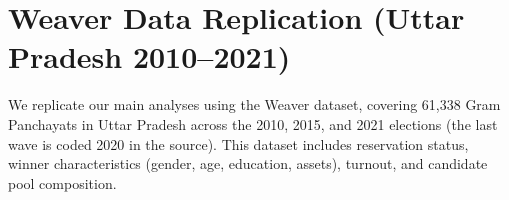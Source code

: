 \documentclass[12pt]{article}
\begin{document}

\FloatBarrier


\clearpage
\section{Weaver Data Replication (Uttar Pradesh 2010--2021)}\label{sec:weaver}

We replicate our main analyses using the Weaver dataset, covering 61,338 Gram Panchayats in Uttar Pradesh across the 2010, 2015, and 2021 elections (the last wave is coded 2020 in the source). This dataset includes reservation status, winner characteristics (gender, age, education, assets), turnout, and candidate pool composition.





\end{document}
